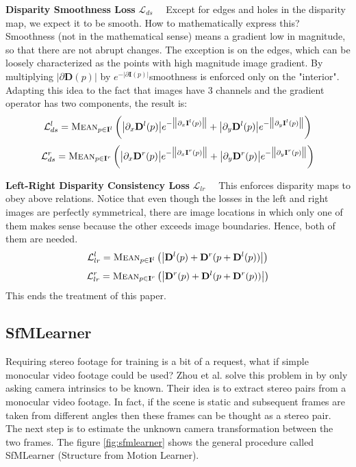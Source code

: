 \textbf{Disparity Smoothness Loss} $\mathcal{L}_{ds} \quad$ Except for edges and holes in the disparity map, we expect it to be smooth.
How to mathematically express this?
Smoothness (not in the mathematical sense) means a gradient low in magnitude, so that there are not abrupt changes.
The exception is on the edges, which can be loosely characterized as the points with high magnitude image gradient.
By multiplying $\big| \partial \mathbf{D}(p) \big|$ by $e^{- \big| \partial \mathbf{I}(p) \big| }$smoothness is enforced only on the "interior".
Adapting this idea to the fact that images have 3 channels and the gradient operator has two components, the result is:
\[
	\mathcal{L}_{ds}^{l} = \textsc{Mean}_{p \in \mathbf{I}^{l}}
		\left(
			\big| \partial_{x} \mathbf{D}^{l}(p) \big| e^{-\big\| \partial_{x} \mathbf{I}^{l}(p) \big\| } + 
			\big| \partial_{y} \mathbf{D}^{l}(p) \big| e^{-\big\| \partial_{y} \mathbf{I}^{l}(p) \big\| }
		\right)
\]\[
	\mathcal{L}_{ds}^{r} = \textsc{Mean}_{p \in \mathbf{I}^{r}}
		\left(
			\big| \partial_{x} \mathbf{D}^{r}(p) \big| e^{-\big\| \partial_{x} \mathbf{I}^{r}(p) \big\| } + 
			\big| \partial_{y} \mathbf{D}^{r}(p) \big| e^{-\big\| \partial_{y} \mathbf{I}^{r}(p) \big\| }
		\right)
\]

\textbf{Left-Right Disparity Consistency Loss} $\mathcal{L}_{lr} \quad$ This enforces disparity maps to obey above relations.
Notice that even though the losses in the left and right images are perfectly symmetrical, there are image locations in which only one of them makes sense because the other exceeds image boundaries.
Hence, both of them are needed.
\[
	\mathcal{L}_{lr}^{l} = \textsc{Mean}_{p \in \mathbf{I}^{l}}
		\left(
			\big| \mathbf{D}^{l}(p) + \mathbf{D}^{r}(p + \mathbf{D}^{l}(p)) \big|
		\right)
\]\[
	\mathcal{L}_{lr}^{r} = \textsc{Mean}_{p \in \mathbf{I}^{r}}
		\left(
			\big| \mathbf{D}^{r}(p) + \mathbf{D}^{l}(p + \mathbf{D}^{r}(p)) \big|
		\right)
\]
This ends the treatment of this paper.

\subsection{SfMLearner}
Requiring stereo footage for training is a bit of a request, what if simple monocular video footage could be used?
Zhou et al. solve this problem in \cite{SfMLearner} by only asking camera intrinsics to be known.
Their idea is to extract stereo pairs from a monocular video footage.
In fact, if the scene is static and subsequent frames are taken from different angles then these frames can be thought as a stereo pair.
The next step is to estimate the unknown camera transformation between the two frames.
The figure \ref{fig:sfmlearner} shows the general procedure called SfMLearner (Structure from Motion Learner).

